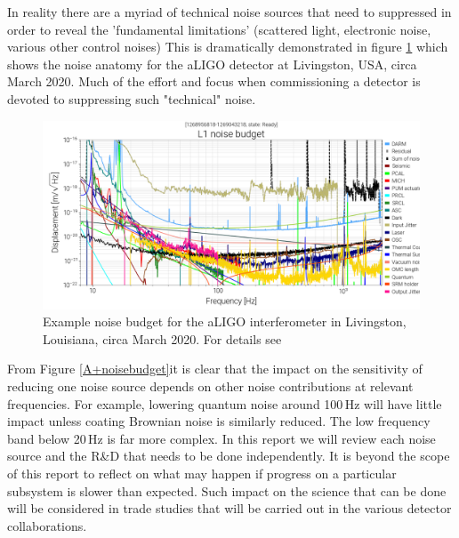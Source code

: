 In reality there are a myriad of technical noise sources that need to suppressed in order to reveal the 'fundamental limitations' (scattered light, electronic noise, various other control noises)  This is dramatically demonstrated in  figure \ref{fig:aLIGO_Noises} which shows the noise anatomy for the \acf{aLIGO} detector at Livingston, \ac{USA},  circa March 2020.  Much  of the effort and focus when commissioning  a detector is devoted to suppressing such "technical"  noise.
\begin{figure}
\includegraphics[width=\textwidth]{Figures/L1-READY_7A4FE0_NOISE_BUDGET-1268956818-86400.png}
\caption{Example noise budget for the \acf{aLIGO} interferometer in Livingston, Louisiana, circa March 2020. For details see~\cite{} }
\label{fig:aLIGO_Noises}
\end{figure}

From Figure \ref{A+noisebudget}it is clear that the impact on the sensitivity of reducing one noise source depends on other noise contributions at relevant frequencies.  
For example, lowering quantum noise around 100\,Hz will have little impact unless coating Brownian noise is similarly reduced.  The low frequency band below 20\,Hz is far more complex.  
In this report we will review each noise source and the R\&D that needs to be done independently.   
It is beyond the scope of this report to reflect on what may happen if progress on a particular subsystem is slower than expected.  
Such impact on the science that can be done will be considered in trade studies that will be carried out in the various detector collaborations.